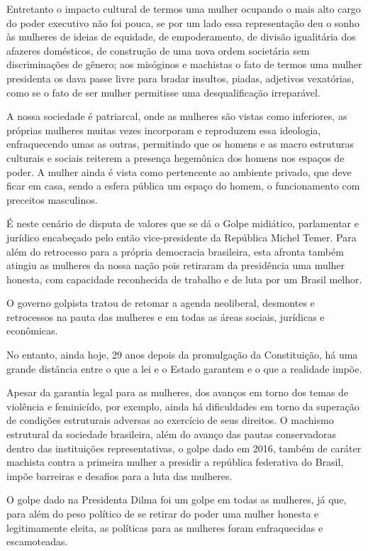 Entretanto o impacto cultural de termos uma mulher ocupando o mais alto
cargo do poder executivo não foi pouca, se por um lado essa
representação deu o sonho às mulheres de ideias de equidade, de
empoderamento, de divisão igualitária dos afazeres domésticos, de
construção de uma nova ordem societária sem discriminações de gênero;
aos misóginos e machistas o fato de termos uma mulher presidenta os dava
passe livre para bradar insultos, piadas, adjetivos vexatórias, como se
o fato de ser mulher permitisse uma desqualificação irreparável.

A nossa sociedade é patriarcal, onde as mulheres são vistas como
inferiores, as próprias mulheres muitas vezes incorporam e reproduzem
essa ideologia, enfraquecendo umas as outras, permitindo que os homens e
as macro estruturas culturais e sociais reiterem a presença hegemônica
dos homens nos espaços de poder. A mulher ainda é vista como pertencente
ao ambiente privado, que deve ficar em casa, sendo a esfera pública um
espaço do homem, o funcionamento com preceitos masculinos.

É neste cenário de disputa de valores que se dá o Golpe midiático,
parlamentar e jurídico encabeçado pelo então vice-presidente da
República Michel Temer. Para além do retrocesso para a própria
democracia brasileira, esta afronta também atingiu as mulheres da nossa
nação pois retiraram da presidência uma mulher honesta, com capacidade
reconhecida de trabalho e de luta por um Brasil melhor.

O governo golpista tratou de retomar a agenda neoliberal, desmontes e
retrocessos na pauta das mulheres e em todas as áreas sociais, jurídicas
e econômicas.

No entanto, ainda hoje, 29 anos depois da promulgação da Constituição,
há uma grande distância entre o que a lei e o Estado garantem e o que a
realidade impõe.

Apesar da garantia legal para as mulheres, dos avanços em torno dos
temas de violência e feminicído, por exemplo, ainda há dificuldades em
torno da superação de condições estruturais adversas ao exercício de
seus direitos. O machismo estrutural da sociedade brasileira, além do
avanço das pautas conservadoras dentro das instituições representativas,
o golpe dado em 2016, também de caráter machista contra a primeira
mulher a presidir a república federativa do Brasil, impõe barreiras e
desafios para a luta das mulheres.

O golpe dado na Presidenta Dilma foi um golpe em todas as mulheres, já
que, para além do peso político de se retirar do poder uma mulher
honesta e legitimamente eleita, as políticas para as mulheres foram
enfraquecidas e escamoteadas.

